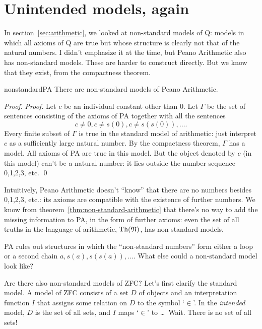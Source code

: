 \section{Unintended models, again}

In section~\ref{sec:arithmetic},
we looked at non-standard models of Q:
models in which all axioms of Q are true
but whose structure is clearly not that of the natural numbers.
I didn't emphasize it at the time,
but Peano Arithmetic also has non-standard models.
These are harder to construct directly.
But we know that they exist,
from the compactness theorem.

\begin{theorem}{}{nonstandardPA}
  There are non-standard models of Peano Arithmetic.
\end{theorem}
\begin{proof}
  \emph{Proof.}
  Let $c$ be an individual constant other than 0.
  Let $\Gamma$ be the set of sentences consisting of
  the axioms of PA together with
  all the sentences
  \[
    c \ne 0, c \ne s(0), c \ne s(s(0)), \ldots.
  \]
  Every finite subset of $\Gamma$ is true in the standard model of arithmetic:
  just interpret $c$ as a sufficiently large natural number.
  By the compactness theorem,
  $\Gamma$ has a model.
  All axioms of PA are true in this model.
  But the object denoted by $c$ (in this model) can't be a natural number:
  it lies outside the number sequence 0,1,2,3, etc.
  \qed
\end{proof}

Intuitively,
Peano Arithmetic doesn't ``know'' that
there are no numbers besides 0,1,2,3, etc.:
its axioms are compatible with the existence of further numbers.
We know from theorem~\ref{thm:non-standard-arithmetic} that
there's no way to add the missing information to PA,
in the form of further axioms:
even the set of all truths in the language of arithmetic, $\mathrm{Th}(\mathfrak{N})$,
has non-standard models.

\begin{exercise}
  PA rules out structures in which
  the ``non-standard numbers'' form either a loop or a second chain $a, s(a), s(s(a)), \ldots$.
  What else could a non-standard model look like?
\end{exercise}

Are there also non-standard models of ZFC?
Let's first clarify the standard model.
A model of ZFC consists of a set $D$ of objects
and an interpretation function $I$
that assigns some relation on $D$ to the symbol `$\in$'.
In the \emph{intended} model,
$D$ is the set of all sets,
and $I$ maps `$\in$' to \ldots\,
Wait.
There is no set of all sets!

